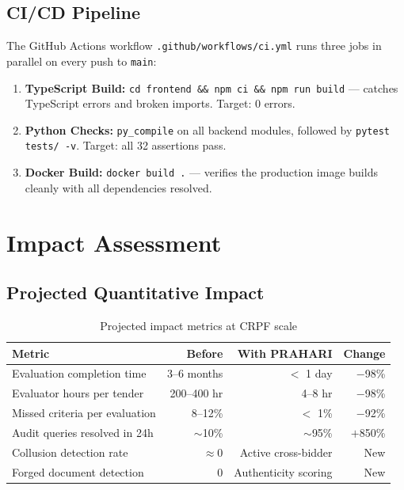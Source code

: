 \documentclass[12pt,a4paper]{article}
\begin{document}
\subsection{CI/CD Pipeline}

The GitHub Actions workflow \texttt{.github/workflows/ci.yml} runs three jobs in
parallel on every push to \texttt{main}:

\begin{enumerate}
\item \textbf{TypeScript Build:} \texttt{cd frontend \&\& npm ci \&\& npm run build}
    — catches TypeScript errors and broken imports. Target: 0 errors.
\item \textbf{Python Checks:} \texttt{py\_compile} on all backend modules,
    followed by \texttt{pytest tests/ -v}. Target: all 32 assertions pass.
\item \textbf{Docker Build:} \texttt{docker build .} — verifies the production
    image builds cleanly with all dependencies resolved.
\end{enumerate}

\section{Impact Assessment}

\subsection{Projected Quantitative Impact}

\begin{table}[H]
\centering
\begin{tabularx}{\linewidth}{@{}Xrrr@{}}
\toprule
\textbf{Metric} & \textbf{Before} & \textbf{With PRAHARI} & \textbf{Change} \\
\midrule
Evaluation completion time    & 3--6 months & $<$ 1 day           & $-$98\% \\
Evaluator hours per tender    & 200--400 hr & 4--8 hr             & $-$98\% \\
Missed criteria per evaluation & 8--12\%    & $<$ 1\%             & $-$92\% \\
Audit queries resolved in 24h & $\sim$10\% & $\sim$95\%          & $+$850\% \\
Collusion detection rate      & $\approx$0 & Active cross-bidder & New \\
Forged document detection     & 0          & Authenticity scoring & New \\
\bottomrule
\end{tabularx}
\caption{Projected impact metrics at CRPF scale}
\end{table}
\end{document}
